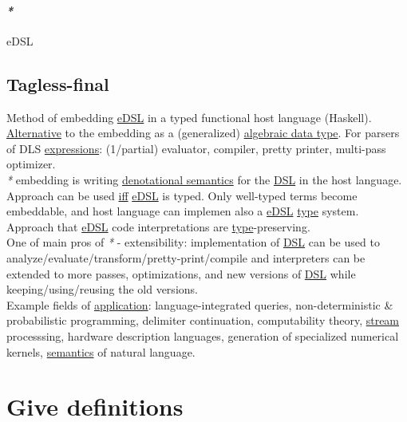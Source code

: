 \documentclass[a4paper,14pt,oneside]{book}
\begin{document}
\subsection{\emph{*}}
\label{sec:org58fb164}

\label{org37d8aec}eDSL\\

\chapter{\label{orgc8ffcfd}Tagless-final}
\label{sec:orgda9649a}
Method of embedding \hyperref[org37d8aec]{eDSL} in a typed functional host language (Haskell). \hyperref[orgcca5451]{Alternative} to the embedding as a (generalized) \hyperref[orgd9e13b0]{algebraic data type}. For parsers of DLS \hyperref[orgf28b2f4]{expressions}: (1/partial) evaluator, compiler, pretty printer, multi-pass optimizer.\\

\emph{*} embedding is writing \hyperref[org0bc890b]{denotational semantics} for the \hyperref[orgab4617f]{DSL} in the host language.\\

Approach can be used \hyperref[orgdeeefb3]{iff} \hyperref[org37d8aec]{eDSL} is typed. Only well-typed terms become embeddable, and host language can implemen also a \hyperref[org37d8aec]{eDSL} \hyperref[orgdbcea73]{type} system. Approach that \hyperref[org37d8aec]{eDSL} code interpretations are \hyperref[orgdbcea73]{type}-preserving.\\

One of main pros of \emph{*} - extensibility: implementation of \hyperref[orgab4617f]{DSL} can be used to analyze/evaluate/transform/pretty-print/compile and interpreters can be extended to more passes, optimizations, and new versions of \hyperref[orgab4617f]{DSL} while keeping/using/reusing the old versions.\\

Example fields of \hyperref[org1793e06]{application}: language-integrated queries, non-deterministic \& probabilistic programming, delimiter continuation, computability theory, \hyperref[org4ebbd3f]{stream} processsing, hardware description languages, generation of specialized numerical kernels, \hyperref[org0fdf3be]{semantics} of natural language.\\

\part{Give definitions}
\label{sec:orgb6dfbb8}
\end{document}
